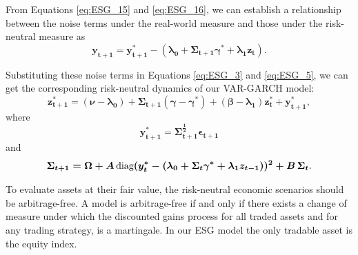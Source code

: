 \documentclass{sfuthesis}
\numberwithin{equation}{chapter}
\begin{document}
	
		\justify
		From Equations \eqref{eq:ESG_15} and \eqref{eq:ESG_16}, we can establish a relationship between the noise terms under the real-world measure and those under the risk-neutral measure as
		\begin{equation}
		\label{eq:ESG_18}
		\boldsymbol{y_{t+1} = y^*_{t+1} - (\lambda_0 +\Sigma_{t+1}\gamma^*+ \lambda_1z_{t})}.
		\end{equation}
	
		\justify
		Substituting these noise terms in Equations \eqref{eq:ESG_3} and \eqref{eq:ESG_5}, we can get the corresponding risk-neutral dynamics of our VAR-GARCH model:
		\begin{equation}
		\label{eq:ESG_19}
		\boldsymbol{z^*_{t+1} = (\nu- \lambda_0) +\Sigma_{t+1}(\gamma - \gamma^*) + (\beta - \lambda_1)z_t^* + y_{t+1}^*},
		\end{equation}
		where
		\begin{equation}
		\label{eq:ESG_20}
		\boldsymbol{y_{t+1}^* = \Sigma_{t+1}^{\frac{1}{2}}\epsilon_{t+1}}
		\end{equation}
		and
		\begin{equation}
		\label{eq:ESG_21}
		\boldsymbol{\Sigma_{t+1} = \Omega + A\,\textnormal{diag}(y_{t}^* - (\lambda_0 + \Sigma_t\gamma^*+\lambda_1z_{t-1}))^2 + B\,\Sigma_{t}}.
		\end{equation}
	
		\justify
		To evaluate assets at their fair value, the risk-neutral economic scenarios should be arbitrage-free. A model is arbitrage-free if and only if there exists a change of measure under which the discounted gains process for all traded assets and for any trading strategy, is a martingale. In our ESG model the only tradable asset is the equity index.
	
\end{document}

